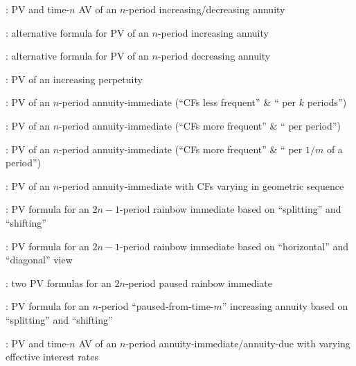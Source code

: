 \item {}: PV and time-\(n\) AV of an \(n\)-period increasing/decreasing annuity
\item {}: alternative formula for PV of an \(n\)-period increasing annuity
\item {}: alternative formula for PV of an \(n\)-period decreasing annuity
\item {}: PV of an increasing perpetuity
\item {}: PV of an \(n\)-period annuity-immediate (``CFs less frequent'' \& `` per \(k\) periods'')
\item {}: PV of an \(n\)-period annuity-immediate (``CFs more frequent'' \& `` per period'')
\item {}: PV of an \(n\)-period annuity-immediate (``CFs more frequent'' \& `` per \(1/m\) of a period'')
\item {}: PV of an \(n\)-period annuity-immediate with CFs varying in geometric sequence
\item {}: PV formula for an \(2n-1\)-period rainbow immediate based on ``splitting'' and ``shifting''
\item {}: PV formula for an \(2n-1\)-period rainbow immediate based on ``horizontal'' and ``diagonal'' view
\item {}: two PV formulas for an \(2n\)-period paused rainbow immediate
\item {}: PV formula for an \(n\)-period ``paused-from-time-\(m\)'' increasing annuity based on ``splitting'' and ``shifting''
\item {}: PV and time-\(n\) AV of an \(n\)-period annuity-immediate/annuity-due with varying effective interest rates

